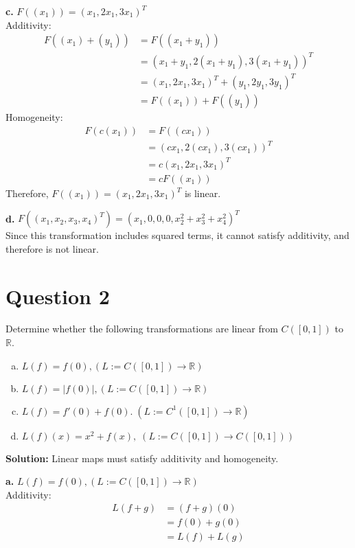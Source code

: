 \documentclass{article}
\begin{document}
\vspace{0.25cm}
\noindent\textbf{c.} $ F((x_1)) = (x_1, 2x_1, 3x_1)^T $ \\
Additivity:
\begin{align*}
    F((x_1) + (y_1)) &= F((x_1 + y_1)) \\
    &= (x_1 + y_1, 2(x_1 + y_1), 3(x_1 + y_1))^T \\
    &= (x_1, 2x_1, 3x_1)^T + (y_1, 2y_1, 3y_1)^T \\
    &= F((x_1)) + F((y_1))
\end{align*}
Homogeneity:
\begin{align*}
    F(c(x_1)) &= F((cx_1)) \\
    &= (cx_1, 2(cx_1), 3(cx_1))^T \\
    &= c(x_1, 2x_1, 3x_1)^T \\
    &= cF((x_1))
\end{align*}
Therefore, $F((x_1)) = (x_1, 2x_1, 3x_1)^T$ is linear.

\vspace{0.25cm}
\noindent\textbf{d.} $ F((x_1, x_2, x_3, x_4)^T) = (x_1, 0, 0, 0, x_2^2 + x_3^2 + x_4^2)^T $\\
Since this transformation includes squared terms, it cannot satisfy additivity, and therefore is not linear.

\section*{Question 2}
Determine whether the following transformations are linear from $C([0,1])$ to $\mathbb{R}$.
\begin{enumerate}[a.]
    \item $ L(f) = f(0), (L := C([0,1]) \to \mathbb{R}) $
    \item $ L(f) = |f(0)|, (L := C([0,1]) \to \mathbb{R}) $
    \item $ L(f) = f'(0) + f(0). \; (L := C^1([0,1]) \to \mathbb{R}) $
    \item $ L(f)(x) = x^2 + f(x), \; (L := C([0,1]) \to C([0,1])) $
\end{enumerate}

\noindent\textbf{Solution:} Linear maps must satisfy additivity and homogeneity.

\vspace{0.25cm}
\noindent\textbf{a.} $ L(f) = f(0), (L := C([0,1]) \to \mathbb{R}) $ \\
Additivity:
\begin{align*}
    L(f + g) &= (f + g)(0) \\
    &= f(0) + g(0) \\
    &= L(f) + L(g)
\end{align*}
\end{document}
